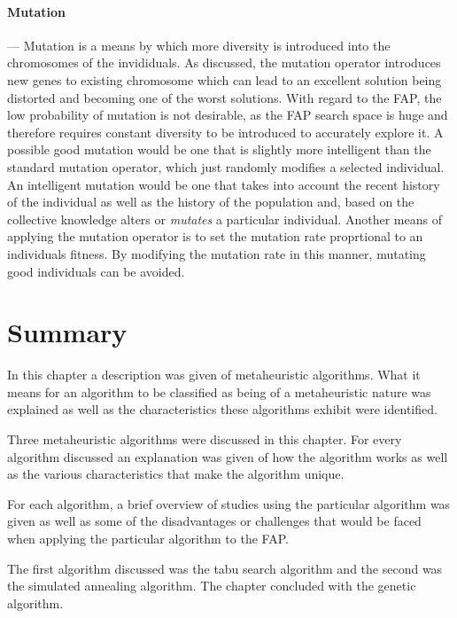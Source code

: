 \paragraph{Mutation}
--- Mutation is a means by which more diversity is introduced into the chromosomes of the invididuals.  As discussed, the mutation operator introduces new genes to existing chromosome which can lead to an excellent solution being distorted and becoming one of the worst solutions. With regard to the \gls{FAP}, the low probability of mutation is not desirable, as the \gls{FAP} search space is huge and therefore requires constant diversity to be introduced to accurately explore it. A possible good mutation would be one that is slightly more intelligent than the standard mutation operator, which just randomly modifies a selected individual. An intelligent mutation would be one that takes into account the recent history of the individual as well as the history of the population and, based on the collective knowledge alters or \emph{mutates} a particular individual. Another means of applying the mutation operator is to set the mutation rate proprtional to an individuals fitness. By modifying the mutation rate in this manner, mutating good individuals can be avoided.
\section {Summary}
In this chapter a description was given of metaheuristic algorithms. What it means for an algorithm to be classified as being of a metaheuristic nature was explained as well as the characteristics these algorithms exhibit were identified.

Three metaheuristic algorithms were discussed in this chapter. For every algorithm discussed an explanation was given of how the algorithm works as well as the various characteristics that make the algorithm unique.

For each algorithm, a brief overview of studies using the particular algorithm was given as well as some of the disadvantages or challenges that would be faced when applying the particular algorithm to the \gls{FAP}.

The first algorithm discussed was the tabu search algorithm and the second was the simulated annealing algorithm. The chapter concluded with the genetic algorithm. 

